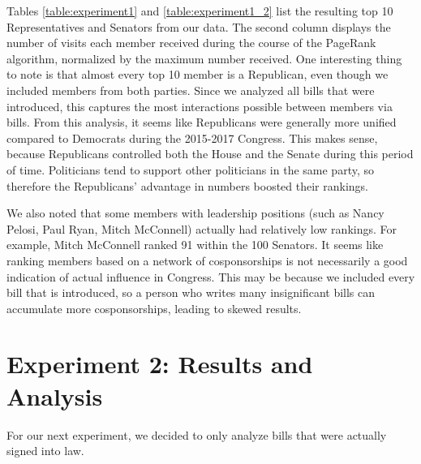\documentclass[11pt]{article}
\begin{document}
Tables \ref{table:experiment1} and \ref{table:experiment1_2} list the resulting top 10 Representatives and Senators from our data. The second column displays the number of visits each member received during the course of the PageRank algorithm, normalized by the maximum number received. One interesting thing to note is that almost every top 10 member is a Republican, even though we included members from both parties. Since we analyzed all bills that were introduced, this captures the most interactions possible between members via bills. From this analysis, it seems like Republicans were generally more unified compared to Democrats during the 2015-2017 Congress. This makes sense, because Republicans controlled both the House and the Senate during this period of time. Politicians tend to support other politicians in the same party, so therefore the Republicans' advantage in numbers boosted their rankings. 

We also noted that some members with leadership positions (such as Nancy Pelosi, Paul Ryan, Mitch McConnell) actually had relatively low rankings. For example, Mitch McConnell ranked 91 within the 100 Senators. It seems like ranking members based on a network of cosponsorships is not necessarily a good indication of actual influence in Congress. This may be because we included every bill that is introduced, so a person who writes many insignificant bills can accumulate more cosponsorships, leading to skewed results.

\section*{Experiment 2: Results and Analysis}
For our next experiment, we decided to only analyze bills that were actually signed into law. 





 

\pagebreak







\end{document}
